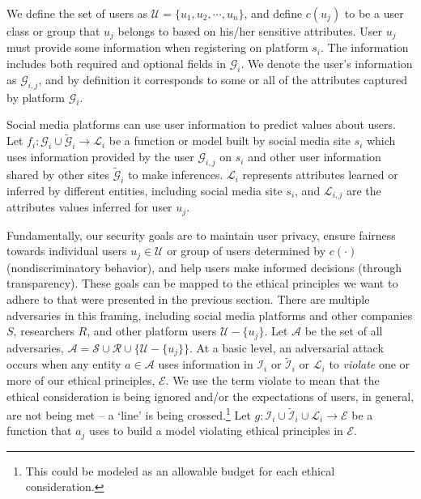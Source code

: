 \documentclass[11pt]{article} %
\begin{document}
We define the set of users as $\mathcal{U} = \{u_1, u_2, \cdots, u_n\}$, and define $c(u_j)$ to be a  user class or group that $u_j$ belongs to based on his/her sensitive attributes. User $u_j$ must provide some information when registering on platform $s_i$. The information includes both required and optional fields in  $\mathcal{G}_i$. We denote the user's information as $\mathcal{G}_{i,j}$, and by definition it corresponds to some or all of the attributes captured by platform $\mathcal{G}_i$. 

Social media platforms can use user information to predict values about users. Let $f_i:\mathcal{G}_i \cup \widetilde{\mathcal{G}}_i \rightarrow \mathcal{L}_i$ be a function or model built by social media site $s_i$ which uses information provided by the user $\mathcal{G}_{i,j}$ on $s_i$ and other user information shared by other sites $\widetilde{\mathcal{G}}_i$ to make inferences. $\mathcal{L}_i$ represents attributes learned or inferred by different entities, including social media site $s_i$, and $\mathcal{L}_{i,j}$ are the attributes values inferred for user $u_j$. 

Fundamentally, our security goals are to maintain user privacy, ensure fairness towards individual users $u_j \in \mathcal{U}$ or group of users determined by $c(\cdot)$ (nondiscriminatory behavior), and help users make informed decisions (through transparency). These goals can be mapped to the ethical principles we want to adhere to that were presented in the previous section. There are multiple adversaries in this framing, including social media platforms and other companies $S$, researchers $R$, and other platform users $\mathcal{U}-\{u_j\}$. Let $\mathcal{A}$ be the set of all adversaries, $\mathcal{A} = \mathcal{S} \cup \mathcal{R} \cup \{ \mathcal{U} - \{u_j\} \}$. At a basic level, an adversarial attack occurs when any entity $a \in \mathcal{A}$ uses information in $\mathcal{I}_i$ or $\widetilde{\mathcal{I}}_i$ or $\mathcal{L}_i$ to \textit{violate} one or more of our ethical principles, $\mathcal{E}$. We use the term violate to mean that the ethical consideration is being ignored and/or the expectations of users, in general, are not being met -- a `line' is being crossed.\footnote{This could be modeled as an allowable budget for each ethical consideration.} Let $g: \mathcal{I}_i \cup \widetilde{\mathcal{I}}_i \cup \mathcal{L}_i \rightarrow \mathcal{E}$ be a function that $a_j$ uses to build a model violating ethical principles in $\mathcal{E}$. 
\end{document}

